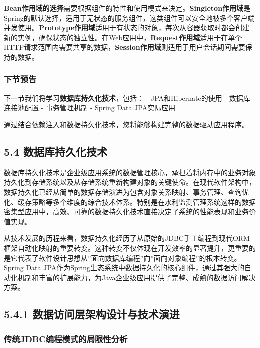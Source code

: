 \textbf{Bean作用域的选择}需要根据组件的特性和使用模式来决定。\textbf{Singleton作用域}是Spring的默认选择，适用于无状态的服务组件，这类组件可以安全地被多个客户端并发使用。\textbf{Prototype作用域}适用于有状态的对象，每次从容器获取时都会创建新的实例，确保状态的独立性。在Web应用中，\textbf{Request作用域}适用于在单个HTTP请求范围内需要共享的数据，\textbf{Session作用域}则适用于用户会话期间需要保持的数据。

\subsubsection{下节预告}\label{ux4e0bux8282ux9884ux544a-1}

下一节我们将学习\textbf{数据库持久化技术}，包括： - JPA和Hibernate的使用 - 数据库连接池配置 - 事务管理机制 - Spring Data JPA实际应用

通过结合依赖注入和数据持久化技术，您将能够构建完整的数据驱动应用程序。

\subsection{5.4 数据库持久化技术}\label{ux6570ux636eux5e93ux6301ux4e45ux5316ux6280ux672f}

数据库持久化技术是企业级应用系统的数据管理核心，承担着将内存中的业务对象持久化到存储系统以及从存储系统重新构建对象的关键使命。在现代软件架构中，数据持久化已经从简单的数据存储演进为包含对象关系映射、事务管理、查询优化、缓存策略等多个维度的综合技术体系。特别是在水利监测管理系统这样的数据密集型应用中，高效、可靠的数据持久化技术直接决定了系统的性能表现和业务价值实现。

从技术发展的历程来看，数据持久化经历了从原始的JDBC手工编程到现代ORM框架自动化映射的重要转变。这种转变不仅体现在开发效率的显著提升，更重要的是它代表了软件设计思想从''面向数据库编程''向''面向对象编程''的根本转变。Spring Data JPA作为Spring生态系统中数据持久化的核心组件，通过其强大的自动化机制和丰富的扩展能力，为Java企业级应用提供了完整、成熟的数据访问解决方案。

\subsection{5.4.1 数据访问层架构设计与技术演进}\label{ux6570ux636eux8bbfux95eeux5c42ux67b6ux6784ux8bbeux8ba1ux4e0eux6280ux672fux6f14ux8fdb}

\subsubsection{传统JDBC编程模式的局限性分析}\label{ux4f20ux7edfjdbcux7f16ux7a0bux6a21ux5f0fux7684ux5c40ux9650ux6027ux5206ux6790}

